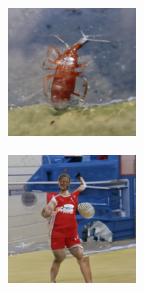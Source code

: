 \documentclass{article}
\begin{document}
\begin{figure}
    \begin{subfigure}[b]{0.5\linewidth}
        \begin{subfigure}[b]{0.242\linewidth}
        \includegraphics[width=\linewidth]{figures/imagenet128/solver_samples/imagenet128_fm_ot_54_05.png}
        \end{subfigure}%
        \begin{subfigure}[b]{0.242\linewidth}
        \includegraphics[width=\linewidth]{figures/imagenet128/solver_samples/imagenet128_fm_ot_54_10.png}

\end{subfigure}
\end{subfigure}
\end{figure}
\end{document}
